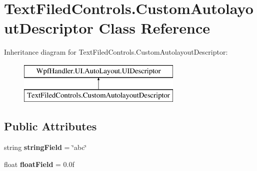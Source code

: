 \hypertarget{class_text_filed_controls_1_1_custom_autolayout_descriptor}{}\section{Text\+Filed\+Controls.\+Custom\+Autolayout\+Descriptor Class Reference}
\label{class_text_filed_controls_1_1_custom_autolayout_descriptor}
Inheritance diagram for Text\+Filed\+Controls.\+Custom\+Autolayout\+Descriptor\+:\begin{figure}[H]
\begin{center}
\leavevmode
\includegraphics[height=2.000000cm]{d2/d1a/class_text_filed_controls_1_1_custom_autolayout_descriptor}
\end{center}
\end{figure}
\subsection*{Public Attributes}
\begin{DoxyCompactItemize}
\item 
\mbox{\label{class_text_filed_controls_1_1_custom_autolayout_descriptor_acb457fb3d84828f30c7ad6d2dda5b12f}} 
string {\bfseries string\+Field} = \char`\"{}abc\char`\"{}
\item 
\mbox{\label{class_text_filed_controls_1_1_custom_autolayout_descriptor_aaab1c4c026275dca1cc153cec1e4eedb}} 
float {\bfseries float\+Field} = 0.\+0f
\end{DoxyCompactItemize}
